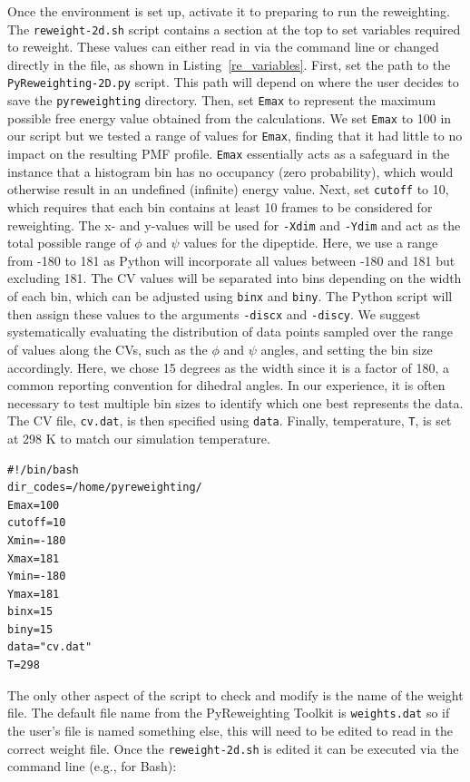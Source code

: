\documentclass[9pt,tutorial,pubversion]{livecoms}
\begin{document}
Once the environment is set up, activate it to preparing to run the reweighting. The \texttt{reweight-2d.sh} script contains a section at the top to set variables required to reweight. These values can either read in via the command line or changed directly in the file, as shown in Listing~\ref{re_variables}. First, set the path to the \texttt{PyReweighting-2D.py} script. This path will depend on where the user decides to save the \texttt{pyreweighting} directory. Then, set \texttt{Emax} to represent the maximum possible free energy value obtained from the calculations. We set \texttt{Emax} to 100 in our script but we tested a range of values for \texttt{Emax}, finding that it had little to no impact on the resulting PMF profile. \texttt{Emax} essentially acts as a safeguard in the instance that a histogram bin has no occupancy (zero probability), which would otherwise result in an undefined (infinite) energy value. Next, set \texttt{cutoff} to 10, which requires that each bin contains at least 10 frames to be considered for reweighting. The x- and y-values will be used for \texttt{-Xdim} and \texttt{-Ydim} and act as the total possible range of $\phi$ and $\psi$ values for the dipeptide. Here, we use a range from -180 to 181 as Python will incorporate all values between -180 and 181 but excluding 181. The CV values will be separated into bins depending on the width of each bin, which can be adjusted using \texttt{binx} and \texttt{biny}. The Python script will then assign these values to the arguments \texttt{-discx} and \texttt{-discy}. We suggest systematically evaluating the distribution of data points sampled over the range of values along the CVs, such as the $\phi$ and $\psi$ angles, and setting the bin size accordingly. Here, we chose 15 degrees as the width since it is a factor of 180, a common reporting convention for dihedral angles. In our experience, it is often necessary to test multiple bin sizes to identify which one best represents the data. The CV file, \texttt{cv.dat}, is then specified using \texttt{data}. Finally, temperature, \texttt{T}, is set at 298 K to match our simulation temperature. 


\bigskip
\begin{lstlisting}[label=re_variables, caption=Reweight-2d.sh, basicstyle=\small, backgroundcolor=\color{light-gray}]
#!/bin/bash
dir_codes=/home/pyreweighting/
Emax=100
cutoff=10
Xmin=-180
Xmax=181
Ymin=-180
Ymax=181
binx=15
biny=15
data="cv.dat"
T=298
\end{lstlisting}

The only other aspect of the script to check and modify is the name of the weight file. The default file name from the PyReweighting Toolkit is \texttt{weights.dat} so if the user's file is named something else, this will need to be edited to read in the correct weight file. Once the \texttt{reweight-2d.sh} is edited it can be executed via the command line (e.g., for Bash):
\end{document}

